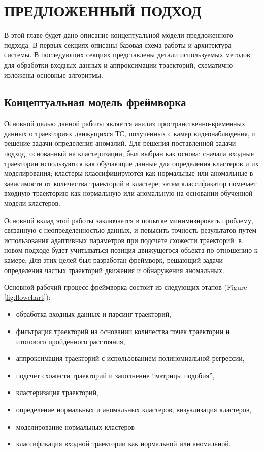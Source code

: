 \chapter{ПРЕДЛОЖЕННЫЙ ПОДХОД}
\label{ch:ПРЕДЛОЖЕННЫЙ ПОДХОД}

В этой главе будет дано описание концептуальной модели предложенного подхода. В первых секциях описаны базовая схема работы и архитектура системы. В последующих секциях представлены детали используемых методов для обработки входных данных и аппроксимации траекторий, схематично изложены основные алгоритмы.

\section{Концептуальная модель фреймворка}
\label{ch:Концептуальная модель фреймворка}

Основной целью данной работы является анализ пространственно-временных данных о траекториях движущихся ТС, полученных с камер видеонаблюдения, и решение задачи определения аномалий. Для решения поставленной задачи подход, основанный на кластеризации, был выбран как основа: сначала входные траектории используются как обучающие данные для определения кластеров и их моделирования; кластеры классифицируются как нормальные или аномальные в зависимости от количества траекторий в кластере; затем классификатор помечает входную траекторию как нормальную или аномальную на основании обученной модели кластеров.

Основной вклад этой работы заключается в попытке минимизировать проблему, связанную с неопределенностью данных, и повысить точность результатов путем использования адаптивных параметров при подсчете схожести траекторий: в новом подходе будет учитываться позиция движущегося объекта по отношению к камере. Для этих целей был разработан фреймворк, решающий задачи определения частых траекторий движения и обнаружения аномальных.

Основной рабочий процесс фреймворка состоит из следующих этапов (Figure \ref{fig:flowchart}):
\begin{itemize}
	\item обработка входных данных и парсинг траекторий,
	\item фильтрация траекторий на основании количества точек траектории и итогового пройденного расстояния,
	\item аппроксимация траекторий с использованием полиномиальной регрессии,
	\item подсчет схожести траекторий и заполнение ``матрицы подобия'',
	\item кластеризация траекторий,
	\item определение нормальных и аномальных кластеров, визуализация кластеров,
	\item моделирование нормальных кластеров
	\item классификация входной траектории как нормальной или аномальной.
\end{itemize}

